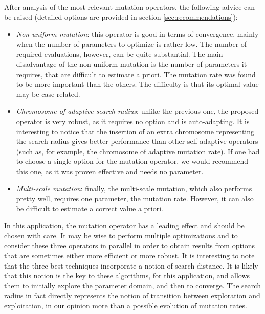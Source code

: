 \documentclass{ametsoc}
\begin{document}
After analysis of the most relevant mutation operators, the following advice can be raised (detailed options are provided in section \ref{sec:recommendations}):

\begin{itemize}
	
	\item \textit{Non-uniform mutation}: this operator is good in terms of convergence, mainly when the number of parameters to optimize is rather low. The number of required evaluations, however, can be quite substantial. The main disadvantage of the non-uniform mutation is the number of parameters it requires, that are difficult to estimate a priori. The mutation rate was found to be more important than the others. The difficulty is that its optimal value may be case-related.
	
	\item \textit{Chromosome of adaptive search radius}: unlike the previous one, the proposed operator is very robust, as it requires no option and is auto-adapting. It is interesting to notice that the insertion of an extra chromosome representing the search radius gives better performance than other self-adaptive operators (such as, for example, the chromosome of adaptive mutation rate). If one had to choose a single option for the mutation operator, we would recommend this one, as it was proven effective and needs no parameter.
	
	\item \textit{Multi-scale mutation}: finally, the multi-scale mutation, which also performs pretty well, requires one parameter, the mutation rate. However, it can also be difficult to estimate a correct value a priori.
	
\end{itemize}

In this application, the mutation operator has a leading effect and should be chosen with care. It may be wise to perform multiple optimizations and to consider these three operators in parallel in order to obtain results from options that are sometimes either more efficient or more robust. It is interesting to note that the three best techniques incorporate a notion of search distance. It is likely that this notion is the key to these algorithms, for this application, and allows them to initially explore the parameter domain, and then to converge. The search radius in fact directly represents the notion of transition between exploration and exploitation, in our opinion more than a possible evolution of mutation rates.
\end{document}
